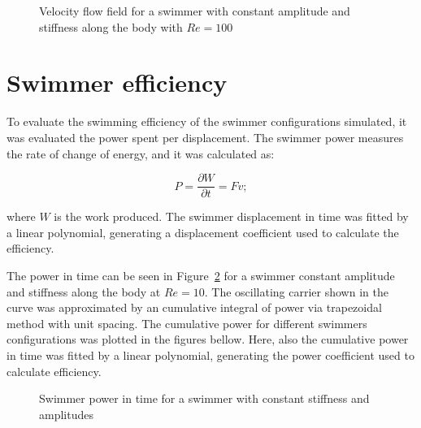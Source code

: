 \begin{figure}[H]
\centering
  \begin{footnotesize}
  
  \caption[Velocity flow field for a swimmer with constant amplitude and stiffness along the body with $Re=100$]{Velocity flow field for a swimmer with constant amplitude and stiffness along the body with $Re=100$}
   \label{fig:Bild4.31}
  \end{footnotesize}
\end{figure}


\section{Swimmer efficiency}
\label{sec:section 7}


To evaluate the swimming efficiency of the swimmer configurations simulated, it was evaluated the power spent per displacement. The swimmer power measures the rate of change of
energy, and it was calculated as:


\begin{equation} 
  P = 	\frac{\partial W}{\partial t} = F v ;
\end{equation}

where $W$ is the work produced. The swimmer displacement in time was fitted by a linear polynomial, generating a displacement coefficient used to calculate the efficiency.\par

The power in time can be seen in Figure~\ref{fig:Bild4.32} for a swimmer constant amplitude and stiffness along the body at $Re=10$. The oscillating carrier shown in the curve was 
approximated by an cumulative integral of power via trapezoidal method with unit spacing. The cumulative power for different swimmers configurations was plotted in the figures bellow.
Here, also the cumulative power in time was fitted by a linear polynomial, generating the power coefficient used to calculate efficiency.




\begin{figure}[H]
\centering
  \begin{footnotesize}
  
  \caption[Swimmer power in time for a swimmer with constant stiffness and amplitudes]{Swimmer power in time for a swimmer with constant stiffness and amplitudes}
   \label{fig:Bild4.32}
  \end{footnotesize}
\end{figure}


